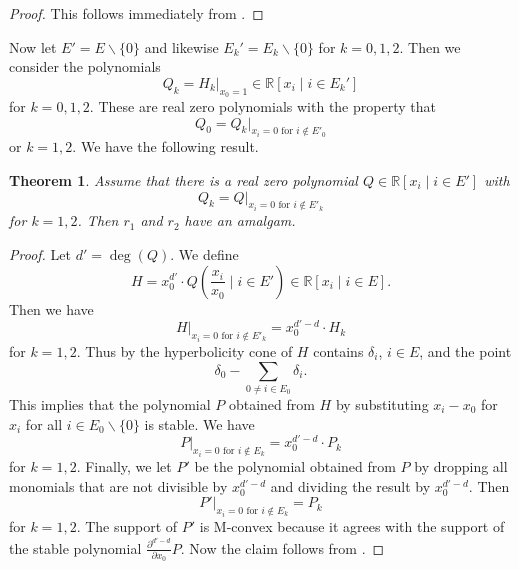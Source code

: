 \documentclass[11pt]{article}
\newtheorem{thm}[theo]{Theorem}
\theoremstyle{definition}
\numberwithin{equation}{section}
\newcommand{\R}{{\mathbb R}}
\begin{document}
\begin{proof}
    This follows immediately from .
\end{proof}

Now let $E'=E\smallsetminus\{0\}$ and likewise $E_k'=E_k\smallsetminus\{0\}$ for $k=0,1,2$. Then we consider the polynomials
\begin{equation*}
    Q_k=H_k|_{x_0=1}\in\R[x_i\mid i\in E_k']
\end{equation*}
for $k=0,1,2$. These are real zero polynomials with the property that
\begin{equation*}
    Q_0=Q_k|_{x_i=0\textrm{ for }i\not\in E'_0}
\end{equation*}
or $k=1,2$. We have the following result.

\begin{thm}\label{thm:amalmain}
    Assume that there is a real zero polynomial $Q\in\R[x_i\mid i\in E']$ with 
    \begin{equation*}
        Q_k=Q|_{x_i=0\textrm{ for }i\not\in E'_k}
    \end{equation*}
    for $k=1,2$. Then $r_1$ and $r_2$ have an amalgam.
\end{thm}

\begin{proof}
    Let $d'=\deg(Q)$. We define
    \begin{equation*}
        H=x_0^{d'}\cdot Q(\frac{x_i}{x_0}\mid i\in E')\in\R[x_i\mid i\in E].
    \end{equation*}
    Then we have
    \begin{equation*}
        H|_{x_i=0\textrm{ for }i\not\in E'_k}=x_0^{d'-d}\cdot H_k
    \end{equation*}
    for $k=1,2$. Thus by  the hyperbolicity cone of $H$ contains $\delta_i$, $i\in E$, and the point
    \begin{equation*}
        \delta_0-\sum_{0\neq i\in E_0}\delta_i.
    \end{equation*}
    This implies that the polynomial $P$ obtained from $H$ by substituting $x_i-x_0$ for $x_i$ for all $i\in E_0\smallsetminus\{0\}$ is stable. We have
    \begin{equation*}
        P|_{x_i=0\textrm{ for }i\not\in E_k}=x_0^{d'-d}\cdot P_k
    \end{equation*}
    for $k=1,2$. Finally, we let $P'$ be the polynomial obtained from $P$ by dropping all monomials that are not divisible by $x_0^{d'-d}$ and dividing the result by $x_0^{d'-d}$. Then
    \begin{equation*}
        P'|_{x_i=0\textrm{ for }i\not\in E_k}=P_k
    \end{equation*}
    for $k=1,2$. The support of $P'$ is M-convex because it agrees with the support of the stable polynomial $\frac{\partial^{d'-d}}{\partial x_0}P$. Now the claim follows from .
\end{proof}
\end{document}
